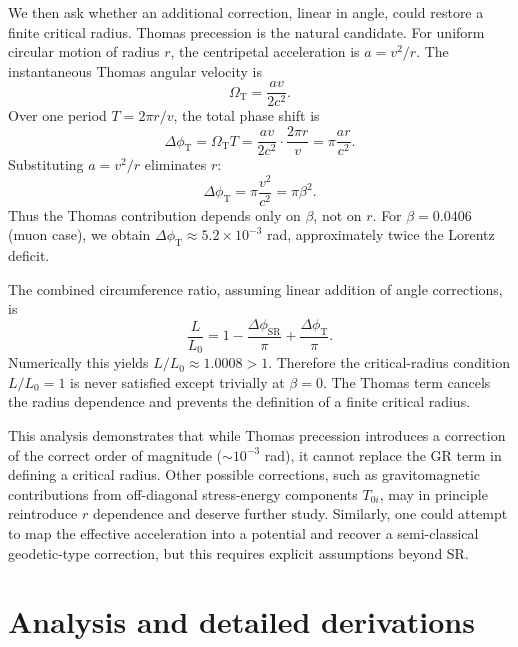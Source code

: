 \documentclass[%
 reprint,
 amsmath,amssymb,
 aps,
]{revtex4-1}
\numberwithin{equation}{section}%
\begin{document}
We then ask whether an additional correction, linear in angle, could restore a finite critical radius. 
Thomas precession is the natural candidate. For uniform circular motion of radius $r$, 
the centripetal acceleration is $a=v^2/r$. The instantaneous Thomas angular velocity is
\begin{equation}
\Omega_{\mathrm{T}} = \frac{a v}{2c^2}.
\end{equation}
Over one period $T=2\pi r/v$, the total phase shift is
\begin{equation}
\Delta \phi_{\mathrm{T}} = \Omega_{\mathrm{T}} T 
= \frac{a v}{2c^2}\cdot \frac{2\pi r}{v} 
= \pi \frac{a r}{c^2}.
\end{equation}
Substituting $a=v^2/r$ eliminates $r$:
\begin{equation}
\Delta \phi_{\mathrm{T}} = \pi \frac{v^2}{c^2} = \pi \beta^2.
\end{equation}
Thus the Thomas contribution depends only on $\beta$, not on $r$. 
For $\beta=0.0406$ (muon case), we obtain $\Delta \phi_{\mathrm{T}} \approx 5.2\times 10^{-3}$ rad, 
approximately twice the Lorentz deficit.

The combined circumference ratio, assuming linear addition of angle corrections, is
\begin{equation}
\frac{L}{L_0} = 1 - \frac{\Delta \phi_{\mathrm{SR}}}{\pi} + \frac{\Delta \phi_{\mathrm{T}}}{\pi}.
\end{equation}
Numerically this yields $L/L_0 \approx 1.0008 > 1$. 
Therefore the critical-radius condition $L/L_0=1$ is never satisfied except trivially at $\beta=0$. 
The Thomas term cancels the radius dependence and prevents the definition of a finite critical radius. 

This analysis demonstrates that while Thomas precession introduces a correction of the correct order of magnitude 
($\sim 10^{-3}$ rad), it cannot replace the GR term in defining a critical radius. 
Other possible corrections, such as gravitomagnetic contributions from off-diagonal stress-energy components $T_{0i}$, 
may in principle reintroduce $r$ dependence and deserve further study. 
Similarly, one could attempt to map the effective acceleration into a potential and 
recover a semi-classical geodetic-type correction, but this requires explicit assumptions beyond SR.


\section{Analysis and detailed derivations}
\end{document}

